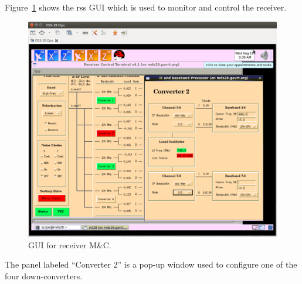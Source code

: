 \documentclass[letterpaper,11pt]{report}
\begin{document}
Figure~\ref{fig:rss} shows the {\ttfamily rss} GUI which is used to monitor
and control the receiver.
\begin{figure}[h!tb]
    \begin{center}
        \includegraphics[width=4.5in]{DSS-28_Ops_162.png}
        \caption{\label{fig:rss}GUI for receiver M\&C.}
    \end{center}
\end{figure}
The panel labeled ``Converter 2'' is a pop-up window used to configure
one of the four down-converters.
\end{document}
